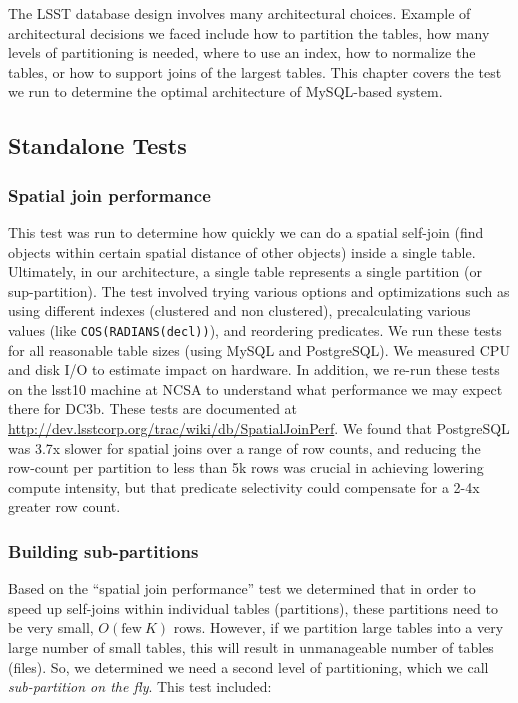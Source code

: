\documentclass[DM,lsstdraft,toc]{lsstdoc}
\begin{document}
The LSST database design involves many architectural choices. Example of
architectural decisions we faced include how to partition the tables,
how many levels of partitioning is needed, where to use an index, how to
normalize the tables, or how to support joins of the largest tables.
This chapter covers the test we run to determine the optimal
architecture of MySQL-based system.

\subsection{Standalone Tests}\label{standalone-tests}

\subsubsection{Spatial join performance}\label{spatial-join-performance}

This test was run to determine how quickly we can do a spatial self-join
(find objects within certain spatial distance of other objects) inside a
single table. Ultimately, in our architecture, a single table represents
a single partition (or sup-partition). The test involved trying various
options and optimizations such as using different indexes (clustered and
non clustered), precalculating various values (like
\texttt{COS(RADIANS(decl))}), and reordering predicates. We run these
tests for all reasonable table sizes (using MySQL and PostgreSQL). We
measured CPU and disk I/O to estimate impact on hardware. In addition,
we re-run these tests on the lsst10 machine at NCSA to understand what
performance we may expect there for DC3b. These tests are documented at
\url{http://dev.lsstcorp.org/trac/wiki/db/SpatialJoinPerf}. We found
that PostgreSQL was 3.7x slower for spatial joins over a range of row
counts, and reducing the row-count per partition to less than 5k rows
was crucial in achieving lowering compute intensity, but that predicate
selectivity could compensate for a 2-4x greater row count.

\subsubsection{Building sub-partitions}\label{building-sub-partitions}

Based on the ``spatial join performance'' test we determined that in
order to speed up self-joins within individual tables (partitions),
these partitions need to be very small, \(O(\mathrm{few~} K)\) rows.
However, if we partition large tables into a very large number of small
tables, this will result in unmanageable number of tables (files). So,
we determined we need a second level of partitioning, which we call
\emph{sub-partition on the fly}. This test included:
\end{document}
